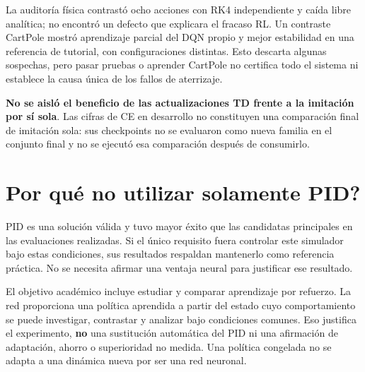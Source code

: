 \documentclass[12pt,a4paper]{article}
\begin{document}
La auditoría física contrastó ocho acciones con RK4 independiente y caída libre analítica; no encontró un defecto que explicara el fracaso RL. Un contraste CartPole mostró aprendizaje parcial del DQN propio y mejor estabilidad en una referencia de tutorial,\allowbreak{} con configuraciones distintas. Esto descarta algunas sospechas,\allowbreak{} pero pasar pruebas o aprender CartPole no certifica todo el sistema ni establece la causa única de los fallos de aterrizaje.


\textbf{No se aisló el beneficio de las actualizaciones TD frente a la imitación por sí sola}. Las cifras de CE en desarrollo no constituyen una comparación final de imitación sola: sus checkpoints no se evaluaron como nueva familia en el conjunto final y no se ejecutó esa comparación después de consumirlo.



\section{\textquestiondown{}Por qué no utilizar solamente PID?}
PID es una solución válida y tuvo mayor éxito que las candidatas principales en las evaluaciones realizadas. Si el único requisito fuera controlar este simulador bajo estas condiciones,\allowbreak{} sus resultados respaldan mantenerlo como referencia práctica. No se necesita afirmar una ventaja neural para justificar ese resultado.


El objetivo académico incluye estudiar y comparar aprendizaje por refuerzo. La red proporciona una política aprendida a partir del estado cuyo comportamiento se puede investigar,\allowbreak{} contrastar y analizar bajo condiciones comunes. Eso justifica el experimento,\allowbreak{} \textbf{no} una sustitución automática del PID ni una afirmación de adaptación,\allowbreak{} ahorro o superioridad no medida. Una política congelada no se adapta a una dinámica nueva por ser una red neuronal.
\end{document}
